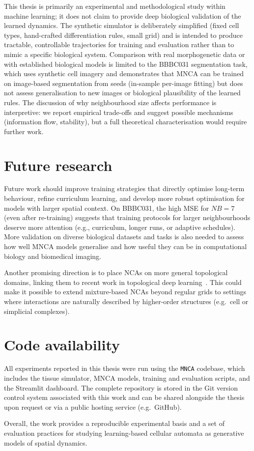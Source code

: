 This thesis is primarily an experimental and methodological study within machine learning; it does not claim to provide deep biological validation of the learned dynamics.
The synthetic simulator is deliberately simplified (fixed cell types, hand-crafted differentiation rules, small grid) and is intended to produce tractable, controllable trajectories for training and evaluation rather than to mimic a specific biological system.
Comparison with real morphogenetic data or with established biological models is limited to the BBBC031 segmentation task, which uses synthetic cell imagery and demonstrates that MNCA can be trained on image-based segmentation from seeds (in-sample per-image fitting) but does not assess generalisation to new images or biological plausibility of the learned rules.
The discussion of why neighbourhood size affects performance is interpretive: we report empirical trade-offs and suggest possible mechanisms (information flow, stability), but a full theoretical characterisation would require further work.

\section{Future research}
\label{sec:conc:future}

Future work should improve training strategies that directly optimise long-term behaviour, refine curriculum learning, and develop more robust optimisation for models with larger spatial context.
On BBBC031, the high MSE for \(NB=7\) (even after re-training) suggests that training protocols for larger neighbourhoods deserve more attention (e.g., curriculum, longer runs, or adaptive schedules).
More validation on diverse biological datasets and tasks is also needed to assess how well MNCA models generalise and how useful they can be in computational biology and biomedical imaging.

Another promising direction is to place NCAs on more general topological domains, linking them to recent work in topological deep learning~\cite{tdl_hajij2023,topox_hajij2024}.
This could make it possible to extend mixture-based NCAs beyond regular grids to settings where interactions are naturally described by higher-order structures (e.g.\ cell or simplicial complexes).

\section*{Code availability}

All experiments reported in this thesis were run using the \texttt{MNCA} codebase, which includes the tissue simulator, MNCA models, training and evaluation scripts, and the Streamlit dashboard.
The complete repository is stored in the Git version control system associated with this work and can be shared alongside the thesis upon request or via a public hosting service (e.g.\ GitHub).

Overall, the work provides a reproducible experimental basis and a set of evaluation practices for studying learning-based cellular automata as generative models of spatial dynamics.
